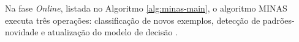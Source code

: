 


Na fase \emph{Online}, listada no Algoritmo \ref{alg:minas-main}, o algoritmo
MINAS executa três operações: classificação de novos exemplos, detecção de
padrões-novidade e atualização do modelo de decisão \cite{Faria2016minas}.

